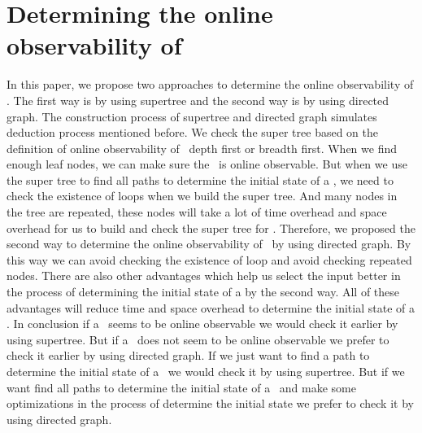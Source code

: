 \section{Determining the online observability of \BCNs}
\label{sec:deter}
In this paper, we propose two approaches to determine the online observability of \BCNs. The first way is by using supertree and the second way is by using directed graph. The construction process of supertree and directed graph simulates deduction process mentioned before. We check the super tree based on the definition of online observability of \BCNs\ depth first or breadth first. When we find enough leaf nodes, we can make sure the \BCN\ is online observable. But when we use the super tree to find all paths to determine the initial state of a \BCN, we need to check the existence of loops when we build the super tree. And many nodes in the tree are repeated, these nodes will take a lot of time overhead and space overhead for us to build and check the super tree for \BCNs. Therefore, we proposed the second way to determine the online observability of \BCNs\ by using directed graph. By this way we can avoid checking the existence of loop and avoid checking repeated nodes. There are also other advantages which help us select the input better in the process of determining the initial state of a \BCN by the second way. All of these advantages will reduce time and space overhead to determine the initial state of a \BCN. In conclusion if a \BCN\ seems to be online observable we would check it earlier by using supertree. But if a  \BCN\ does not seem to be online observable we prefer to check it earlier by using directed graph. If we just want to find a path to determine the initial state of a \BCN\ we would check it by using supertree. But if we want find all paths to determine the initial state of a \BCN\ and make some optimizations in the process of determine the initial state we prefer to check it by using directed graph.

